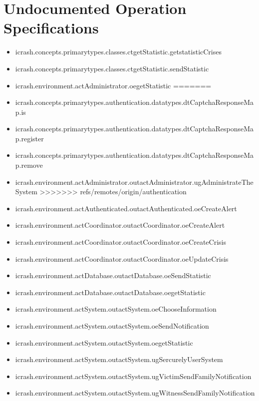\section[Undocumented Operation Specifications]{Undocumented Operation Specifications}
\begin{itemize}
<<<<<<< HEAD
\item icrash.concepts.primarytypes.classes.ctgetStatistic.getstatisticCrises 
\item icrash.concepts.primarytypes.classes.ctgetStatistic.sendStatistic 
\item icrash.environment.actAdministrator.oegetStatistic 
=======
\item icrash.concepts.primarytypes.authentication.datatypes.dtCaptchaResponseMap.is 
\item icrash.concepts.primarytypes.authentication.datatypes.dtCaptchaResponseMap.register 
\item icrash.concepts.primarytypes.authentication.datatypes.dtCaptchaResponseMap.remove 
\item icrash.environment.actAdministrator.outactAdministrator.ugAdministrateTheSystem 
>>>>>>> refs/remotes/origin/authentication
\item icrash.environment.actAuthenticated.outactAuthenticated.oeCreateAlert 
\item icrash.environment.actCoordinator.outactCoordinator.oeCreateAlert 
\item icrash.environment.actCoordinator.outactCoordinator.oeCreateCrisis 
\item icrash.environment.actCoordinator.outactCoordinator.oeUpdateCrisis 
\item icrash.environment.actDatabase.outactDatabase.oeSendStatistic 
\item icrash.environment.actDatabase.outactDatabase.oegetStatistic 
\item icrash.environment.actSystem.outactSystem.oeChooseInformation 
\item icrash.environment.actSystem.outactSystem.oeSendNotification 
\item icrash.environment.actSystem.outactSystem.oegetStatistic 
\item icrash.environment.actSystem.outactSystem.ugSercurelyUserSystem 
\item icrash.environment.actSystem.outactSystem.ugVictimSendFamilyNotification 
\item icrash.environment.actSystem.outactSystem.ugWitnessSendFamilyNotification 
\end{itemize}





